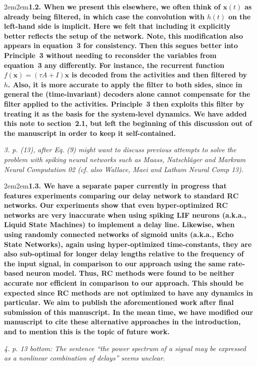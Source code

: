 \documentclass[a4paper]{article}
\newcommand{\newl}{\par\null\par}
\newcommand{\REVIEW}[1]{{\it #1}}
\newcommand{\REPLY}[1]{\newl\begin{adjustwidth}{2em}{2em}{\bf #1}\end{adjustwidth}\newl}
\begin{document}
\REPLY{1.2. When we present this elsewhere, we often think of ${\mathbf x}(t)$ as already being filtered, in which case the convolution with $h(t)$ on the left-hand side is implicit.
Here we felt that including it explicitly better reflects the setup of the network.
Note, this modification also appears in equation~3 for consistency.
Then this segues better into Principle~3 without needing to reconsider the variables from equation~3 any differently.
For instance, the recurrent function $f({\mathbf x}) = (\tau A + I){\mathbf x}$ is decoded from the activities and then filtered by $h$.
Also, it is more accurate to apply the filter to both sides, since in general the (time-invariant) decoders alone cannot compensate for the filter applied to the activities.
Principle~3 then exploits this filter by treating it as the basis for the system-level dynamics.
We have added this note to section~2.1, but left the beginning of this discussion out of the manuscript in order to keep it self-contained.
}

\REVIEW{3. p. (13), after Eq. (9) might want to discuss previous attempts to solve the problem with spiking neural networks such as Maass, Natschläger and Markram Neural Computation 02 (cf. also Wallace, Maei and Latham Neural Comp 13).}

\REPLY{1.3. We have a separate paper currently in progress that features experiments comparing our delay network to standard RC networks.
Our experiments show that even hyper-optimized RC networks are very inaccurate when using spiking LIF neurons (a.k.a., Liquid State Machines) to implement a delay line.
Likewise, when using randomly connected networks of sigmoid units (a.k.a., Echo State Networks), again using hyper-optimized time-constants, they are also sub-optimal for longer delay lengths relative to the frequency of the input signal, in comparison to our approach using the same rate-based neuron model.
Thus, RC methods were found to be neither accurate nor efficient in comparison to our approach.
This should be expected since RC methods are not optimized to have any dynamics in particular.
We aim to publish the aforementioned work after final submission of this manuscript.
In the mean time, we have modified our manuscript to cite these alternative approaches in the introduction, and to mention this is the topic of future work.}

\REVIEW{4. p. 13 bottom: The sentence ``the power spectrum of a signal may be expressed as a nonlinear combination of delays'' seems unclear.}
\end{document}
